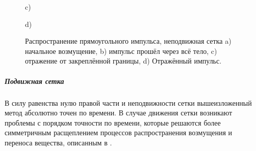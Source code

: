 \begin{figure}
\begin{minipage}[h]{0.47\linewidth}
 c) \\
\end{minipage}
\hfill
\begin{minipage}[h]{0.47\linewidth}
 d) \\
\end{minipage}
\caption{Распространение прямоугольного импульса, неподвижная сетка a) начальное возмущение, b)
импульс прошёл через всё тело, c) отражение от закреплённой границы, d) Отражённый импульс.}
\label{pic:el-non-mv}
\end{figure}

\subparagraph{Подвижная сетка}
В силу равенства нулю правой части и неподвижности сетки вышеизложенный метод абсолютно точен по времени. В случае движения сетки возникают проблемы с порядком точности по времени, которые решаются более симметричным расщеплением процессов распространения возмущения и переноса вещества, описанным в .

